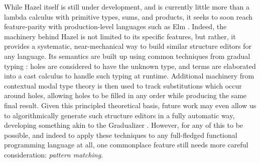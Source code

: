 While Hazel itself is still under development, and is currently little more than a lambda calculus with primitive types, sums, and products, it seeks to soon reach feature-parity with production-level languages such as Elm \cite{DBLP:conf/pldi/CzaplickiC13, Elm, DBLP:journals/pacmpl/OmarVCH19}. Indeed, the machinery behind Hazel is not limited to its specific features, but rather, it provides a systematic, near-mechanical way to build similar structure editors for any language. Its semantics are built up using common techniques from gradual typing \cite{DBLP:conf/snapl/SiekVCB15}: holes are considered to have the unknown type, and terms are elaborated into a cast calculus to handle such typing at runtime. Additional machinery from contextual modal type theory \cite{DBLP:journals/tocl/NanevskiPP08} is then used to track substitutions which occur around holes, allowing holes to be filled in any order while producing the same final result. Given this principled theoretical basis, future work may even allow us to algorithmically generate such structure editors in a fully automatic way, developing something akin to the Gradualizer \cite{DBLP:conf/popl/CiminiS16}. However, for any of this to be possible, and indeed to apply these techniques to any full-fledged functional programming language at all, one commonplace feature still needs more careful consideration: \emph{pattern matching}.